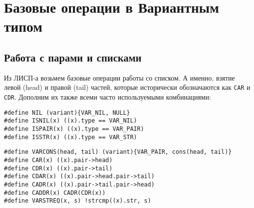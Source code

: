 \documentclass[10pt]{report}
\begin{document}
\section{Базовые операции в Вариантным типом}
\subsection{Работа с парами и списками}
Из ЛИСП-а возьмем базовые операции работы со списком. А именно, взятие левой (head) и правой (tail) частей, которые исторически\cite{lisp} обозначаются как \texttt{CAR} и \texttt{CDR}. Дополним их также всеми часто используемыми комбинациями:
\begin{lstlisting}[firstnumber=25, caption=nlisp.h -- проверка типа]
#define NIL (variant){VAR_NIL, NULL}
#define ISNIL(x) ((x).type == VAR_NIL)
#define ISPAIR(x) ((x).type == VAR_PAIR)
#define ISSTR(x) ((x).type == VAR_STR)
\end{lstlisting}
\begin{lstlisting}[firstnumber=36, caption=nlisp.h -- работа со списком]
#define VARCONS(head, tail) (variant){VAR_PAIR, cons(head, tail)}
#define CAR(x) ((x).pair->head)
#define CDR(x) ((x).pair->tail)
#define CDAR(x) ((x).pair->head.pair->tail)
#define CADR(x) ((x).pair->tail.pair->head)
#define CADDR(x) CADR(CDR(x))
#define VARSTREQ(x, s) !strcmp((x).str, s)
\end{lstlisting}
\end{document}
